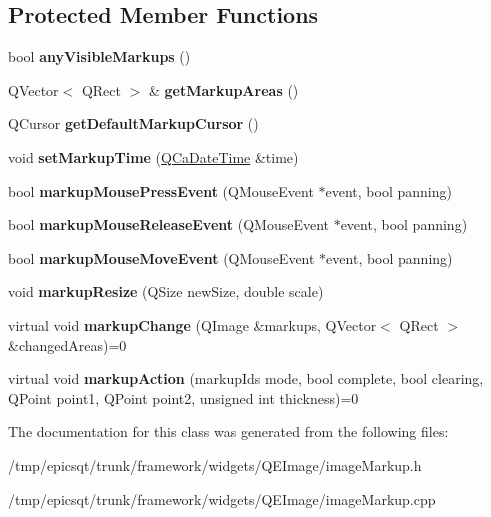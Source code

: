 \subsection*{Protected Member Functions}
\begin{DoxyCompactItemize}
\item 
\hypertarget{classimageMarkup_aeae4ffbe6d20b76c25724d47250b374b}{
bool {\bfseries anyVisibleMarkups} ()}
\label{classimageMarkup_aeae4ffbe6d20b76c25724d47250b374b}

\item 
\hypertarget{classimageMarkup_a4e4f63ab4958c63466c1dfe5e86a4dd0}{
QVector$<$ QRect $>$ \& {\bfseries getMarkupAreas} ()}
\label{classimageMarkup_a4e4f63ab4958c63466c1dfe5e86a4dd0}

\item 
\hypertarget{classimageMarkup_a9a21ffbaedcb65a9c8e2ddedf1dcd2f3}{
QCursor {\bfseries getDefaultMarkupCursor} ()}
\label{classimageMarkup_a9a21ffbaedcb65a9c8e2ddedf1dcd2f3}

\item 
\hypertarget{classimageMarkup_afc6de4b750eccb99e8a50aff52c2218e}{
void {\bfseries setMarkupTime} (\hyperlink{classQCaDateTime}{QCaDateTime} \&time)}
\label{classimageMarkup_afc6de4b750eccb99e8a50aff52c2218e}

\item 
\hypertarget{classimageMarkup_a2dce50b10368db7e162aa1724defab88}{
bool {\bfseries markupMousePressEvent} (QMouseEvent $\ast$event, bool panning)}
\label{classimageMarkup_a2dce50b10368db7e162aa1724defab88}

\item 
\hypertarget{classimageMarkup_aafaaaa8cc99e1f79f69638fcb2a78188}{
bool {\bfseries markupMouseReleaseEvent} (QMouseEvent $\ast$event, bool panning)}
\label{classimageMarkup_aafaaaa8cc99e1f79f69638fcb2a78188}

\item 
\hypertarget{classimageMarkup_a0caa63fa8f11118f3afb46741e649c1b}{
bool {\bfseries markupMouseMoveEvent} (QMouseEvent $\ast$event, bool panning)}
\label{classimageMarkup_a0caa63fa8f11118f3afb46741e649c1b}

\item 
\hypertarget{classimageMarkup_a1da1eb66cead902e79742ecad744b5f5}{
void {\bfseries markupResize} (QSize newSize, double scale)}
\label{classimageMarkup_a1da1eb66cead902e79742ecad744b5f5}

\item 
\hypertarget{classimageMarkup_ace2d0f869a42c8742160c0acd4b6af31}{
virtual void {\bfseries markupChange} (QImage \&markups, QVector$<$ QRect $>$ \&changedAreas)=0}
\label{classimageMarkup_ace2d0f869a42c8742160c0acd4b6af31}

\item 
\hypertarget{classimageMarkup_a015205c484b8406f41fcc897e6e53776}{
virtual void {\bfseries markupAction} (markupIds mode, bool complete, bool clearing, QPoint point1, QPoint point2, unsigned int thickness)=0}
\label{classimageMarkup_a015205c484b8406f41fcc897e6e53776}

\end{DoxyCompactItemize}


The documentation for this class was generated from the following files:\begin{DoxyCompactItemize}
\item 
/tmp/epicsqt/trunk/framework/widgets/QEImage/imageMarkup.h\item 
/tmp/epicsqt/trunk/framework/widgets/QEImage/imageMarkup.cpp\end{DoxyCompactItemize}
